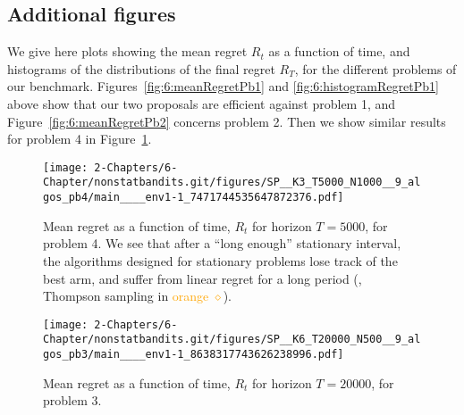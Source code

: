 \subsection{Additional figures}\label{app:6:moreFigures}

We give here plots showing the mean regret $R_t$ as a function of time, and histograms of the distributions of the final regret $R_T$, for the different problems of our benchmark.
%
Figures~\ref{fig:6:meanRegretPb1} and \ref{fig:6:histogramRegretPb1} above show that our two proposals are efficient against problem 1, and Figure~\ref{fig:6:meanRegretPb2} concerns problem 2.
Then we show similar results for problem 4 in Figure~\ref{fig:6:meanRegretPb4}.


\begin{figure}[h!]  %
    \centering
    \texttt{[image: 2-Chapters/6-Chapter/nonstatbandits.git/figures/SP\_\_K3\_T5000\_N1000\_\_9\_algos\_pb4/main\_\_\_\_env1-1\_7471744535647872376.pdf]}
    \caption[Mean regret as a function of time, $R_t$ for horizon $T = 5000$, for problem 4. We see that after a ``long enough'' stationary interval, the algorithms designed for stationary problems lose track of the best arm, and suffer from linear regret for a long period.]{Mean regret as a function of time, $R_t$ for horizon $T = 5000$, for problem 4. We see that after a ``long enough'' stationary interval, the algorithms designed for stationary problems lose track of the best arm, and suffer from linear regret for a long period (\eg, Thompson sampling in \textcolor{orange}{orange $\diamond$}).}
    \label{fig:6:meanRegretPb4}
\end{figure}

\begin{figure}[h!]  %
    \centering
    \texttt{[image: 2-Chapters/6-Chapter/nonstatbandits.git/figures/SP\_\_K6\_T20000\_N500\_\_9\_algos\_pb3/main\_\_\_\_env1-1\_8638317743626238996.pdf]}
    \caption{Mean regret as a function of time, $R_t$ for horizon $T = 20000$, for problem 3.}
    \label{fig:6:meanRegretPb3}
\end{figure}


